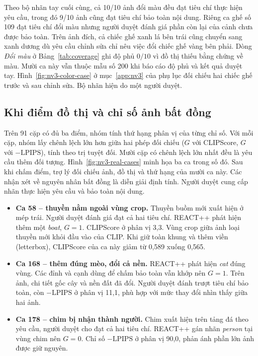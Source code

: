 Theo bộ nhãn tay cuối cùng, cả 10/10 ảnh đổi màu đều đạt tiêu chí thực hiện
yêu cầu, trong đó 9/10 ảnh cũng đạt tiêu chí bảo toàn nội dung. Riêng ca ghế số 109
đạt tiêu chí đổi màu nhưng người duyệt đánh giá phần còn lại của cảnh chưa
được bảo toàn. Trên ảnh đích, cả chiếc ghế xanh lá bên trái cũng chuyển sang
xanh dương dù yêu cầu chỉnh sửa chỉ nêu việc đổi chiếc ghế vàng bên phải. Dòng \textit{Đổi màu} ở Bảng~\ref{tab:coverage} ghi độ phủ
$0/10$ vì đồ thị thiếu bằng chứng về màu. Mười ca này vẫn thuộc mẫu số 200
khi báo cáo độ phủ và kết quả duyệt tay. Hình~\ref{fig:nv3-color-case} ở mục~\ref{app:nv3} của phụ lục đối chiếu hai chiếc ghế trước và sau chỉnh sửa. Bộ nhãn hiện do một người duyệt.

\subsection{Khi điểm đồ thị và chỉ số ảnh bất đồng}
Trên 91 cặp có đủ ba điểm, nhóm tính thứ hạng phân vị của từng chỉ số.
Với mỗi cặp, nhóm lấy chênh lệch lớn hơn giữa hai phép đối chiếu
($G$ với CLIPScore, $G$ với $-\mathrm{LPIPS}$), tính theo trị tuyệt đối.
Mười cặp có chênh lệch lớn nhất đều là yêu cầu thêm đối tượng.
Hình~\ref{fig:nv3-real-cases} minh họa ba ca trong số đó.
Sau khi chấm điểm, trợ lý đối chiếu ảnh, đồ thị và thứ hạng của mười ca này.
Các nhận xét về nguyên nhân bất đồng là diễn giải định tính. Người duyệt cung cấp
nhãn thực hiện yêu cầu và bảo toàn nội dung.

\begin{itemize}
\item \textbf{Ca 58 -- thuyền nằm ngoài vùng crop.} Thuyền buồm mới xuất hiện ở mép trái. Người duyệt đánh giá đạt cả hai tiêu chí. REACT++ phát hiện thêm một \textit{boat}, $G=1$. CLIPScore ở phân vị 3,3. Vùng crop giữa ảnh loại thuyền mới khỏi đầu vào của CLIP. Khi giữ toàn khung và thêm viền (letterbox), CLIPScore của ca này giảm từ 0,589 xuống 0,565.
\item \textbf{Ca 168 -- thêm đúng mèo, đổi cả nền.} REACT++ phát hiện \textit{cat} đúng vùng. Các đỉnh và cạnh dùng để chấm bảo toàn vẫn khớp nên $G=1$. Trên ảnh, chi tiết gốc cây và nền đất đã đổi. Người duyệt đánh trượt tiêu chí bảo toàn, còn $-\mathrm{LPIPS}$ ở phân vị 11,1, phù hợp với mức thay đổi nhìn thấy giữa hai ảnh.
\item \textbf{Ca 178 -- chim bị nhận thành người.} Chim xuất hiện trên tảng đá theo yêu cầu, người duyệt cho đạt cả hai tiêu chí. REACT++ gán nhãn \textit{person} tại vùng chim nên $G=0$. Chỉ số $-\mathrm{LPIPS}$ ở phân vị 90,0, phản ánh phần lớn ảnh được giữ nguyên.
\end{itemize}

